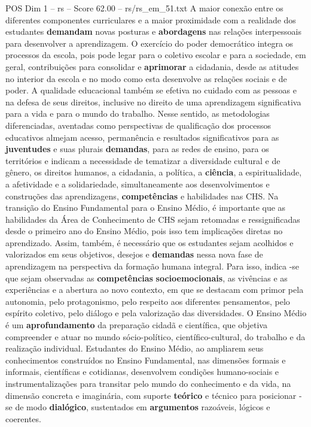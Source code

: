 \begin{textsample}{POS Dim 1 – rs – Score 62.00 – rs/rs\_em\_51.txt}
A maior conexão entre os diferentes componentes curriculares e a maior proximidade com a realidade dos estudantes \textbf{demandam} novas posturas e \textbf{abordagens} nas relações interpessoais para desenvolver a aprendizagem.
O exercício do poder democrático integra os processos da escola, pois pode legar para o coletivo escolar e para a sociedade, em geral, contribuições para consolidar e \textbf{aprimorar} a cidadania, desde as atitudes no interior da escola e no modo como esta desenvolve as relações sociais e de poder.
A qualidade educacional também se efetiva no cuidado com as pessoas e na defesa de seus direitos, inclusive no direito de uma aprendizagem significativa para a vida e para o mundo do trabalho.
Nesse sentido, as metodologias diferenciadas, aventadas como perspectivas de qualificação dos processos educativos almejam acesso, permanência e resultados significativos para as \textbf{juventudes} e suas plurais \textbf{demandas}, para as redes de ensino, para os territórios e indicam a necessidade de tematizar a diversidade cultural e de gênero, os direitos humanos, a cidadania, a política, a \textbf{ciência}, a espiritualidade, a afetividade e a solidariedade, simultaneamente aos desenvolvimentos e construções das aprendizagens, \textbf{competências} e habilidades nas CHS.
Na transição do Ensino Fundamental para o Ensino Médio, é importante que as habilidades da Área de Conhecimento de CHS sejam retomadas e ressignificadas desde o primeiro ano do Ensino Médio, pois isso tem implicações diretas no aprendizado.
Assim, também, é necessário que os estudantes sejam acolhidos e valorizados em seus objetivos, desejos e \textbf{demandas} nessa nova fase de aprendizagem na perspectiva da formação humana integral.
Para isso, indica -se que sejam observadas as \textbf{competências} \textbf{socioemocionais}, as vivências e as experiências e a abertura ao novo contexto, em que se destacam com primor pela autonomia, pelo protagonismo, pelo respeito aos diferentes pensamentos, pelo espírito coletivo, pelo diálogo e pela valorização das diversidades.
O Ensino Médio é um \textbf{aprofundamento} da preparação cidadã e científica, que objetiva compreender e atuar no mundo sócio-político, científico-cultural, do trabalho e da realização individual.
Estudantes do Ensino Médio, ao ampliarem seus conhecimentos construídos no Ensino Fundamental, nas dimensões formais e informais, científicas e cotidianas, desenvolvem condições humano-sociais e instrumentalizações para transitar pelo mundo do conhecimento e da vida, na dimensão concreta e imaginária, com suporte \textbf{teórico} e técnico para posicionar -se de modo \textbf{dialógico}, sustentados em \textbf{argumentos} razoáveis, lógicos e coerentes.

\end{textsample}
